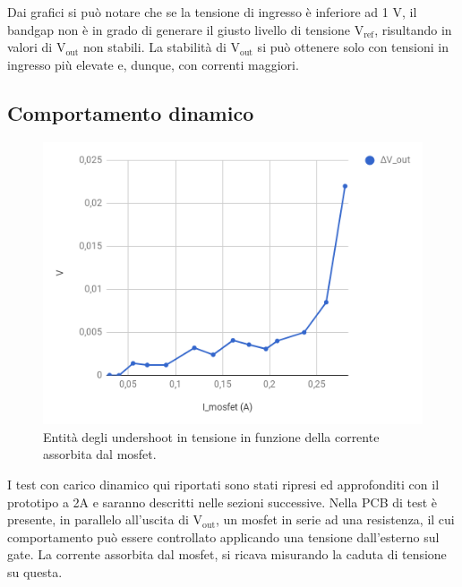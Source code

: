 Dai grafici si può notare che se la tensione di ingresso è inferiore ad 1 V, il bandgap non è in grado di generare il giusto livello di tensione $\mathrm{V_{ref}}$, risultando in valori di $\mathrm{V_{out}}$ non stabili.
La stabilità di $\mathrm{V_{out}}$ si può ottenere solo con tensioni in ingresso più elevate e, dunque, con correnti maggiori.

\subsection{Comportamento dinamico}
\label{343}
\begin{figure}[!hbt]
\centering
\includegraphics[scale=.5]{Immagini/SLDO5singlepulse}
\caption{Entità degli undershoot in tensione in funzione della corrente assorbita dal mosfet.}
\label{SLDO5singlepulse}
\end{figure}

I test con carico dinamico qui riportati sono stati ripresi ed approfonditi con il prototipo a 2A e saranno descritti nelle sezioni successive.
Nella PCB di test è presente, in parallelo all'uscita di $\mathrm{V_{out}}$, un mosfet in serie ad una resistenza, il cui comportamento può essere controllato applicando una tensione dall'esterno sul gate. 
La corrente assorbita dal mosfet, si ricava misurando la caduta di tensione su questa. 

